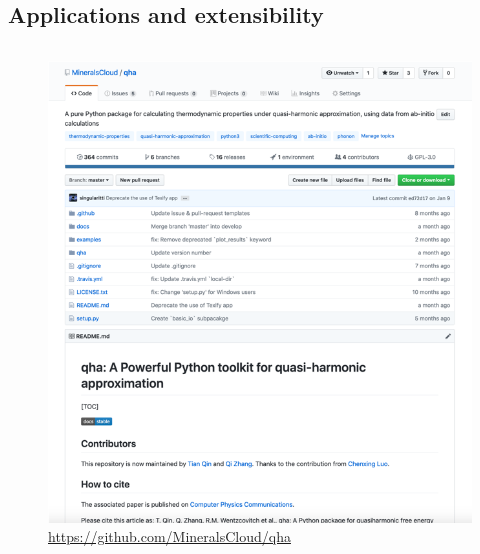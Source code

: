 \documentclass[13pt,aspectratio=169]{beamer}
\begin{document}
\subsection{Applications and extensibility}
\begin{frame}{\subsecname}
	\begin{columns}
		\begin{column}{0.45\textwidth}
			\begin{figure}
				\includegraphics[height=0.8\textheight]{images/website}%
				\captionsetup{labelformat=empty}
				\caption{\scriptsize\url{https://github.com/MineralsCloud/qha}}
			\end{figure}
		\end{column}


\end{columns}
\end{frame}
\end{document}

